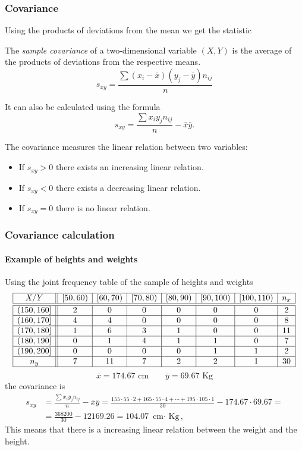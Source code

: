 \begin{frame}
\frametitle{Covariance}
Using the products of deviations from the mean we get the statistic
\begin{definition}
The \emph{sample covariance} of a two-dimensional variable $(X,Y)$ is the average of the products of deviations from
the respective means.
\[
s_{xy}=\frac{\sum (x_i-\bar x)(y_j-\bar y)n_{ij}}{n}
\]
\end{definition}
It can also be calculated using the formula
\[
s_{xy}=\frac{\sum x_iy_jn_{ij}}{n}-\bar x\bar y.
\]

The covariance measures the linear relation between two variables:
\begin{itemize}
\item If $s_{xy}>0$ there exists an increasing linear relation.
\item If $s_{xy}<0$ there exists a decreasing linear relation.
\item If $s_{xy}=0$ there is no linear relation.
\end{itemize}
\end{frame}


\begin{frame}
\frametitle{Covariance calculation}
\framesubtitle{Example of heights and weights}
Using the joint frequency table of the sample of heights and weights
\[
\begin{array}{|c||c|c|c|c|c|c|c|}
\hline
  X/Y & [50,60) & [60,70) & [70,80) & [80,90) & [90,100) & [100,110) & n_x\\
  \hline\hline
  (150,160] & 2 & 0 & 0 & 0 & 0 & 0 & 2\\
  \hline
  (160,170] & 4 & 4 & 0 & 0 & 0 & 0 & 8\\
  \hline
  (170,180] & 1 & 6 & 3 & 1 & 0 & 0 & 11 \\
  \hline
  (180,190] & 0 & 1 & 4 & 1 & 1 & 0 & 7 \\
  \hline
  (190,200] & 0 & 0 & 0 & 0 & 1 & 1 & 2\\
  \hline
  n_y & 7 & 11 & 7 & 2 & 2 & 1 & 30\\
  \hline
\end{array}
\]
\[
\bar x = 174.67 \mbox{ cm} \qquad \bar y = 69.67 \mbox{ Kg}
\]
the covariance is 
\begin{align*}
s_{xy} &=\frac{\sum x_iy_jn_{ij}}{n}-\bar x\bar y =  \frac{155\cdot 55\cdot 2 + 165\cdot 55\cdot 4 + \cdots + 195\cdot 105\cdot 1}{30}-174.67\cdot 69.67 =\\
& = \frac{368200}{30}-12169.26 = 104.07 \mbox{ cm$\cdot$ Kg},
\end{align*}
This means that there is a increasing linear relation between the weight and the height.
\end{frame}



